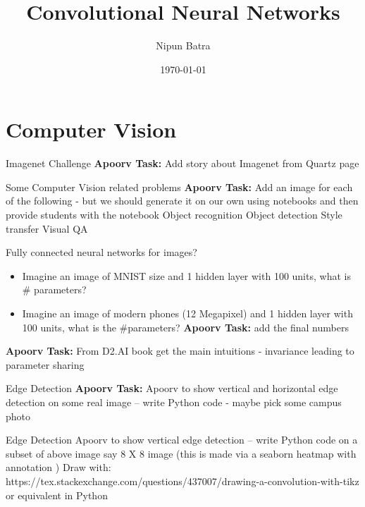 \documentclass{beamer}
\title{Convolutional Neural Networks}
\date{\today}
\author{Nipun Batra}
\institute{IIT Gandhinagar}
\newcommand{\red}[1]{{\color{red}\small \textbf{Apoorv Task:} #1}}
\begin{document}
  \maketitle
  
  
  
\section{Computer Vision}

\begin{frame}{Imagenet Challenge}
\red{Add story about Imagenet from Quartz page}
\end{frame}

\begin{frame}{Some Computer Vision related problems}
\red{Add an image for each of the following - but we should generate it on our own using notebooks and then provide students with the notebook}
Object recognition
Object detection
Style transfer
Visual QA
\end{frame}

\begin{frame}{Fully connected neural networks for images?}
\begin{itemize}
	\item Imagine an image of MNIST size and 1 hidden layer with 100 units, what is \# parameters?
	\item Imagine an image of modern phones (12 Megapixel) and 1 hidden layer with 100 units, what is the \#parameters?
	\red{add the final numbers}
\end{itemize}
\end{frame}

\begin{frame}
\red{From D2.AI book get the main intuitions - invariance leading to parameter sharing}
\end{frame}

\begin{frame}{Edge Detection}
\red{Apoorv to show vertical and horizontal edge detection on some real image -- write Python code - maybe pick some campus photo}

\end{frame}
\begin{frame}{Edge Detection}
Apoorv to show vertical edge detection -- write Python code on a subset of above image say 8 X 8 image (this is made via a seaborn heatmap with annotation ) 
Draw with: https://tex.stackexchange.com/questions/437007/drawing-a-convolution-with-tikz or equivalent in Python


\end{frame}
\end{document}
